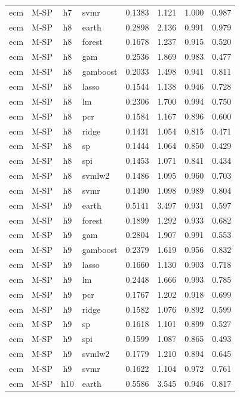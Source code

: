\begin{ThreePartTable}
\begin{longtable}[t]{llclcccc}
ecm & M-SP & h7 & svmr & 0.1383 & 1.121 & 1.000 & 0.987\\
\addlinespace
ecm & M-SP & h8 & earth & 0.2898 & 2.136 & 0.991 & 0.979\\
ecm & M-SP & h8 & forest & 0.1678 & 1.237 & 0.915 & 0.520\\
ecm & M-SP & h8 & gam & 0.2536 & 1.869 & 0.983 & 0.477\\
ecm & M-SP & h8 & gamboost & 0.2033 & 1.498 & 0.941 & 0.811\\
ecm & M-SP & h8 & lasso & 0.1544 & 1.138 & 0.946 & 0.728\\
ecm & M-SP & h8 & lm & 0.2306 & 1.700 & 0.994 & 0.750\\
ecm & M-SP & h8 & pcr & 0.1584 & 1.167 & 0.896 & 0.600\\
ecm & M-SP & h8 & ridge & 0.1431 & 1.054 & 0.815 & 0.471\\
ecm & M-SP & h8 & sp & 0.1444 & 1.064 & 0.850 & 0.429\\
ecm & M-SP & h8 & spi & 0.1453 & 1.071 & 0.841 & 0.434\\
ecm & M-SP & h8 & svmlw2 & 0.1486 & 1.095 & 0.960 & 0.703\\
ecm & M-SP & h8 & svmr & 0.1490 & 1.098 & 0.989 & 0.804\\
\addlinespace
ecm & M-SP & h9 & earth & 0.5141 & 3.497 & 0.931 & 0.597\\
ecm & M-SP & h9 & forest & 0.1899 & 1.292 & 0.933 & 0.682\\
ecm & M-SP & h9 & gam & 0.2804 & 1.907 & 0.991 & 0.553\\
ecm & M-SP & h9 & gamboost & 0.2379 & 1.619 & 0.956 & 0.832\\
ecm & M-SP & h9 & lasso & 0.1660 & 1.130 & 0.903 & 0.718\\
ecm & M-SP & h9 & lm & 0.2448 & 1.666 & 0.993 & 0.785\\
ecm & M-SP & h9 & pcr & 0.1767 & 1.202 & 0.918 & 0.699\\
ecm & M-SP & h9 & ridge & 0.1582 & 1.076 & 0.892 & 0.599\\
ecm & M-SP & h9 & sp & 0.1618 & 1.101 & 0.899 & 0.527\\
ecm & M-SP & h9 & spi & 0.1599 & 1.087 & 0.865 & 0.493\\
ecm & M-SP & h9 & svmlw2 & 0.1779 & 1.210 & 0.894 & 0.645\\
ecm & M-SP & h9 & svmr & 0.1622 & 1.104 & 0.972 & 0.761\\
\addlinespace
ecm & M-SP & h10 & earth & 0.5586 & 3.545 & 0.946 & 0.817\\

\end{longtable}
\end{ThreePartTable}
